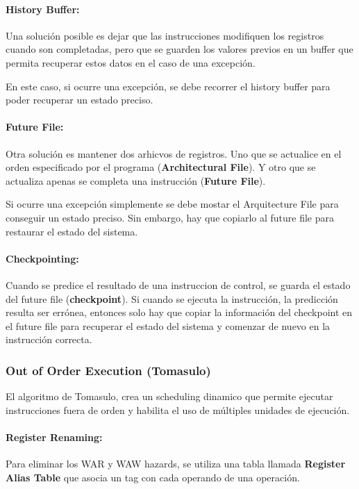 \paragraph{History Buffer:} Una solución posible es dejar que las instrucciones modifiquen los registros cuando son completadas, pero que se guarden los valores previos en un buffer que permita recuperar estos datos en el caso de una excepción.

En este caso, si ocurre una excepción, se debe recorrer el history buffer para poder recuperar un estado preciso.

\paragraph{Future File:} Otra solución es mantener dos arhicvos de registros. Uno que se actualice en el orden especificado por el programa (\textbf{Architectural File}). Y otro que se actualiza apenas se completa una instrucción (\textbf{Future File}).

Si ocurre una excepción simplemente se debe mostar el Arquitecture File para conseguir un estado preciso. Sin embargo, hay que copiarlo al future file para restaurar el estado del sistema.

\paragraph{Checkpointing:} Cuando se predice el resultado de una instruccion de control, se guarda el estado del future file (\textbf{checkpoint}). Si cuando se ejecuta la instrucción, la predicción resulta ser errónea, entonces solo hay que copiar la información del checkpoint en el future file para recuperar el estado del sistema y comenzar de nuevo en la instrucción correcta.  

\subsubsection{Out of Order Execution (Tomasulo)}
El algoritmo de Tomasulo, crea un scheduling dinamico que permite ejecutar instrucciones fuera de orden y habilita el uso de múltiples unidades de ejecución.

\paragraph{Register Renaming:} Para eliminar los WAR y WAW hazards, se utiliza una tabla llamada \textbf{Register Alias Table} que asocia un tag con cada operando de una operación.

